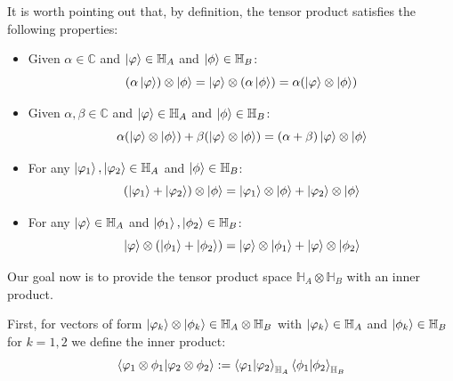 It is worth pointing out that, by definition, the tensor product satisfies the following properties:
\begin{itemize}
    \item Given $\alpha \in \mathbb{C}$ and $\ket{\varphi} \in \mathbb{H}_A$ and $\ket{\phi} \in \mathbb{H}_B$:
    $$(\alpha \ket{\varphi}) \otimes \ket{\phi} = \ket{\varphi} \otimes (\alpha \ket{\phi} ) = \alpha (\ket{\varphi} \otimes \ket{\phi})$$

    \item Given $\alpha, \beta \in \mathbb{C}$ and $\ket{\varphi} \in \mathbb{H}_A$ and $\ket{\phi} \in \mathbb{H}_B$:
    $$\alpha(\ket{\varphi}\otimes \ket{\phi}) + \beta(\ket{\varphi}\otimes \ket{\phi}) = (\alpha +\beta)\ket{\varphi} \otimes \ket{\phi}$$

    \item For any $\ket{\varphi_1}, \ket{\varphi_2} \in \mathbb{H}_A$ and $\ket{\phi}\in \mathbb{H}_B$:
    $$(\ket{\varphi_1}+\ket{\varphi_2} ) \otimes \ket{\phi} = \ket{\varphi_1} \otimes \ket{\phi} + \ket{\varphi_2} \otimes \ket{\phi}$$

    \item For any $\ket{\varphi} \in \mathbb{H}_A$ and $\ket{\phi_1}, \ket{\phi_2}\in \mathbb{H}_B$:
    $$\ket{\varphi} \otimes (\ket{\phi_1}+\ket{\phi_2} )  = \ket{\varphi} \otimes \ket{\phi_1} + \ket{\varphi} \otimes \ket{\phi_2}$$
\end{itemize}

Our goal now is to provide the tensor product space $\mathbb{H}_A \otimes \mathbb{H}_B$ with an inner product.

First, for vectors of form $\ket{\varphi_k} \otimes \ket{\phi_k} \in \mathbb{H}_A \otimes \mathbb{H}_B$ with $\ket{\varphi_k} \in \mathbb{H}_A$ and $\ket{\phi_k} \in \mathbb{H}_B$ for $k=1,2$ we define the inner product:
\begin{equation}\label{eq:inner product tensor}
    \braket{\varphi_1 \otimes \phi_1 | \varphi_2 \otimes \phi_2} := \braket{\varphi_1|\varphi_2}_{\mathbb{H}_A} \braket{\phi_1 | \phi_2}_{\mathbb{H}_B}
\end{equation}


